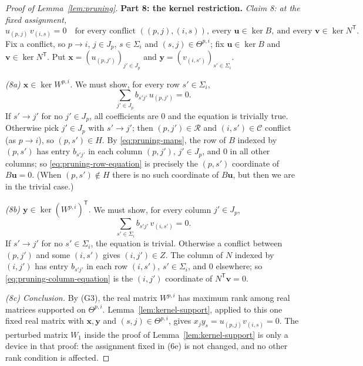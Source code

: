 \documentclass[11pt]{article}
\theoremstyle{remark}
\newcommand{\Step}[1]{\par\medskip\noindent\textbf{#1}\enspace}
\newcommand{\tp}{^{\mathsf T}}
\newcommand{\cR}{\mathcal R}
\newcommand{\cC}{\mathcal C}
\newcommand{\bu}{\mathbf u}
\newcommand{\bv}{\mathbf v}
\newcommand{\bx}{\mathbf x}
\newcommand{\by}{\mathbf y}
\begin{document}
\begin{proof}[Proof of Lemma~\ref{lem:pruning}]
\Step{Part 8: the kernel restriction.}
\emph{Claim 8: at the fixed assignment,}
\begin{equation}\label{eq:conflict-kernel}
 u_{(p,j)}\,v_{(i,s)}=0
 \quad\text{for every conflict }((p,j),(i,s)),
 \ \text{every }\bu\in\ker B,\ \text{and every }\bv\in\ker N\tp.
\end{equation}
Fix a conflict, so $p\to i$, $j\in J_p$, $s\in\Sigma_i$ and
$(s,j)\in\Theta^{p,i}$; fix $\bu\in\ker B$ and $\bv\in\ker N\tp$. Put
$\bx=(u_{(p,j')})_{j'\in J_p}$ and $\by=(v_{(i,s')})_{s'\in\Sigma_i}$.

\smallskip\noindent\emph{(8a) $\bx\in\ker W^{p,i}$.}
We must show, for every row $s'\in\Sigma_i$,
\begin{equation}\label{eq:pruning-row-equation}
 \sum_{j'\in J_p}b_{s'j'}\,u_{(p,j')}=0.
\end{equation}
If $s'\to j'$ for no $j'\in J_p$, all coefficients are $0$ and the equation
is trivially true. Otherwise pick $j'\in J_p$ with $s'\to j'$; then
$(p,j')\in\cR$ and $(i,s')\in\cC$ conflict (as $p\to i$), so $(p,s')\in H$.
By \eqref{eq:pruning-maps}, the row of $B$ indexed by $(p,s')$ has entry
$b_{s'j'}$ in each column $(p,j')$, $j'\in J_p$, and $0$ in all other
columns; so \eqref{eq:pruning-row-equation} is precisely the $(p,s')$
coordinate of $B\bu=0$. (When $(p,s')\notin H$ there is no such coordinate
of $B\bu$, but then we are in the trivial case.)

\smallskip\noindent\emph{(8b) $\by\in\ker(W^{p,i})\tp$.}
We must show, for every column $j'\in J_p$,
\begin{equation}\label{eq:pruning-column-equation}
 \sum_{s'\in \Sigma_i}b_{s'j'}\,v_{(i,s')}=0.
\end{equation}
If $s'\to j'$ for no $s'\in\Sigma_i$, the equation is trivial. Otherwise a
conflict between $(p,j')$ and some $(i,s')$ gives $(i,j')\in Z$. The column
of $N$ indexed by $(i,j')$ has entry $b_{s'j'}$ in each row $(i,s')$,
$s'\in\Sigma_i$, and $0$ elsewhere; so \eqref{eq:pruning-column-equation} is
the $(i,j')$ coordinate of $N\tp\bv=0$.

\smallskip\noindent\emph{(8c) Conclusion.}
By (G3), the real matrix $W^{p,i}$ has maximum rank among real matrices
supported on $\Theta^{p,i}$. Lemma~\ref{lem:kernel-support}, applied to this
one fixed real matrix with $\bx,\by$ and $(s,j)\in\Theta^{p,i}$, gives
$x_jy_s=u_{(p,j)}v_{(i,s)}=0$. The perturbed matrix $W_1$ inside the proof
of Lemma~\ref{lem:kernel-support} is only a device in that proof: the
assignment fixed in (6e) is not changed, and no other rank condition is
affected.


\end{proof}
\end{document}
